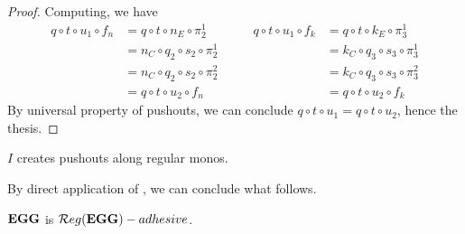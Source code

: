 \begin{proof}
	Computing, we have
	\[
		\begin{split}
			q \circ t \circ u_1 \circ f_n &= q \circ t \circ n_E \circ \pi_2^1 \\ &= n_C \circ q_2 \circ s_2 \circ \pi_2^1 \\&= n_C \circ q_2 \circ s_2 \circ \pi_2^2 \\&=q \circ t \circ u_2 \circ f_n 
			\end{split}
			\qquad
			\begin{split} q \circ t \circ u_1 \circ f_k &= q \circ t \circ k_E \circ \pi_3^1 \\ &= k_C \circ q_3 \circ s_3 \circ \pi_3^1 \\&= k_C \circ q_3 \circ s_3 \circ \pi_3^2 \\&=q \circ t \circ u_2 \circ f_k
			\end{split}
	\]
	By universal property of pushouts, we can conclude $q \circ t \circ u_1 = q \circ t \circ u_2$, hence the thesis. 
\end{proof}


\begin{cor}
	$I$ creates pushouts along regular monos.
\end{cor}

By direct application of , we can conclude what follows.

\begin{cor}
	$\mathbf{EGG}$ is $\mathcal{R}eg(\mathbf{EGG})-adhesive$.
\end{cor}





